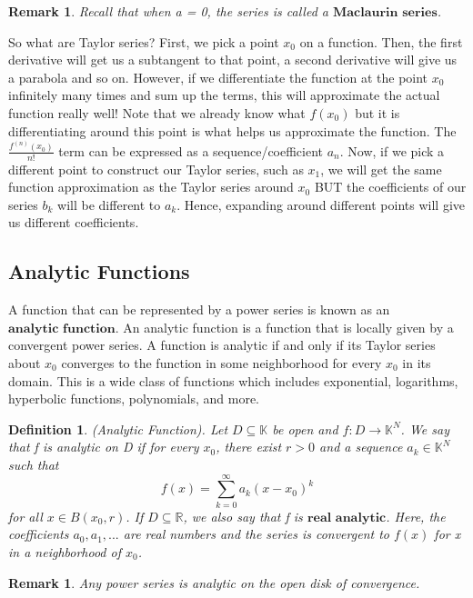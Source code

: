 \documentclass[twoside]{article}
\newtheorem{remark}[theorem]{Remark}
\newtheorem{definition}[theorem]{Definition}
\begin{document}
\begin{remark}Recall that when a = 0, the series is called a $\textbf{Maclaurin series}$.
\end{remark}

So what are Taylor series? First, we pick a point $x_0$ on a function. Then, the first derivative will get us a subtangent to that point, a second derivative will give us a parabola and so on. However, if we differentiate the function at the point $x_0$ infinitely many times and sum up the terms, this will approximate the actual function really well! Note that we already know what $f(x_0)$ but it is differentiating around this point is what helps us approximate the function. The $\frac{f^{(n)}(x_0)}{n!}$ term can be expressed as a sequence/coefficient $a_n$. Now, if we pick a different point to construct our Taylor series, such as $x_1$, we will get the same function approximation as the Taylor series around $x_0$ BUT the coefficients of our series $b_k$ will be different to $a_k$. Hence, expanding around different points will give us different coefficients.


\subsection{Analytic Functions}
 A function that can be represented by a power series is known as an $\textbf{analytic function}$. An analytic function is a function that is locally given by a convergent power series. A function is analytic if and only if its Taylor series about $x_0$ converges to the function in some neighborhood for every $x_0$ in its domain. This is a wide class of functions which includes exponential, logarithms, hyperbolic functions, polynomials, and more.

\begin{definition}(Analytic Function). Let $D \subseteq \mathbb{K}$ be open and $f: D \rightarrow \mathbb{K}^N$. We say that f is analytic on D if for every $x_0$, there exist $r > 0$ and a sequence $a_k \in \mathbb{K}^N$ such that
$$
f(x) = \sum_{k=0}^{\infty}a_k(x - x_0)^k
$$
for all $x \in B(x_0,r)$. If $D \subseteq \mathbb{R}$, we also say that f is $\textbf{real analytic}$.
Here, the coefficients $a_0,a_1,...$ are real numbers and the series is convergent to $f(x)$ for x in a neighborhood of $x_0$.
\end{definition}

\begin{remark} Any power series is analytic on the open disk of convergence.
\end{remark}
\end{document}
